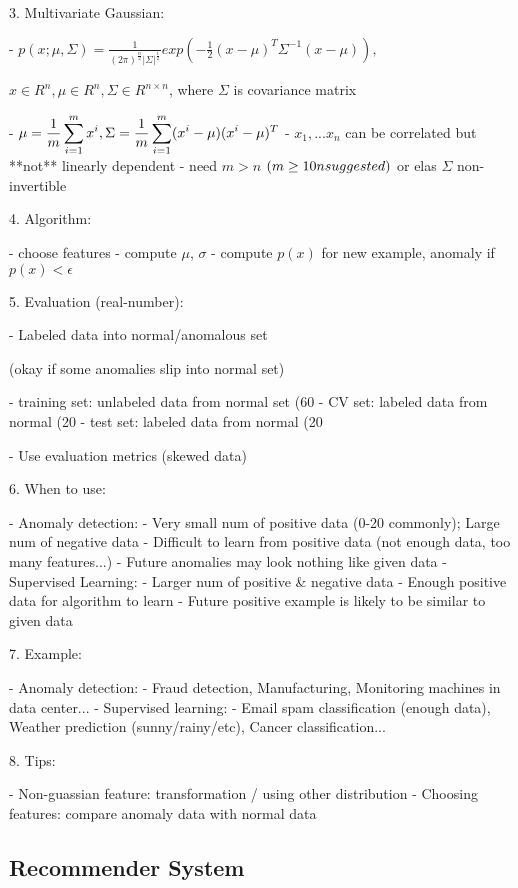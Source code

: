 3. Multivariate Gaussian:

- $\displaystyle p(x;\mu,\Sigma)=\frac1{(2\pi)^{\frac n2} |\Sigma|^{\frac 12}} exp(-\frac12 (x-\mu)^T \Sigma^{-1} (x-\mu)),$  

$x\in R^n, \mu\in R^n,\Sigma\in R^{n\times n}$, where $\Sigma$ is covariance matrix

- $\displaystyle \mu=\frac1m \sum^m_{i=1}x^i,\space \Sigma=\frac 1m \sum^m_{i=1}(x^i-\mu)(x^i-\mu)^T$ 
- $x_1,...x_n$ can be correlated but **not** linearly dependent
- need $m > n$ $(m\ge10n\space suggested)$ or elas $\Sigma$ non-invertible

4. Algorithm:

- choose features
- compute $\mu$, $\sigma$
- compute $p(x)$ for new example, anomaly if $p(x) < \epsilon $ 

5. Evaluation (real-number):

- Labeled data into normal/anomalous set

(okay if some anomalies slip into normal set)

- training set: unlabeled data from normal set (60%
- CV set: labeled data from normal (20%
- test set: labeled data from normal (20%

- Use evaluation metrics (skewed data)

6. When to use:

- Anomaly detection:
- Very small num of positive data (0-20 commonly); Large num of negative data
- Difficult to learn from positive data (not enough data, too many features...)
- Future anomalies may look nothing like given data
- Supervised Learning:
- Larger num of positive \& negative data
- Enough positive data for algorithm to learn
- Future positive example is likely to be similar to given data

7. Example:

- Anomaly detection:
- Fraud detection, Manufacturing, Monitoring machines in data center...
- Supervised learning:
- Email spam classification (enough data), Weather prediction (sunny/rainy/etc), Cancer classification...

8. Tips:

- Non-guassian feature: transformation / using other distribution
- Choosing features: compare anomaly data with normal data


\subsection{Recommender System}

